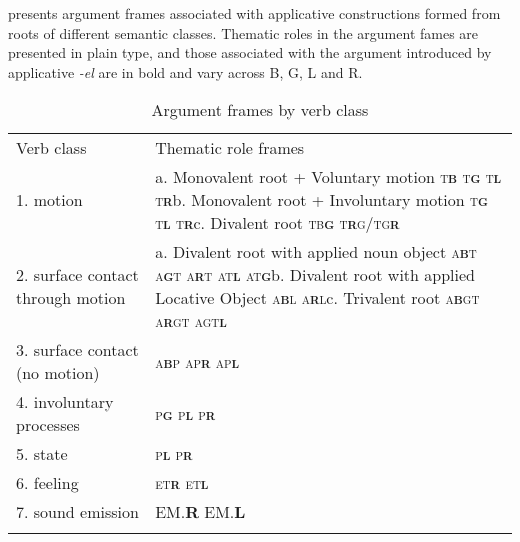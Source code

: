\documentclass[output=paper]{langsci/langscibook}
\begin{document}
 presents argument frames associated with applicative constructions formed from roots of different semantic classes. Thematic roles in the argument fames are presented in plain type, and those associated with the argument introduced by applicative \textit{-el} are in bold and vary across B, G, L and R. 

\begin{table}
\caption{Argument frames by verb class}
\label{tab:2}

\begin{tabularx}{\textwidth}{XX}
\lsptoprule
{Verb class} & {Thematic role frames}\\
{1. motion} & {a. Monovalent root + Voluntary motion} {\textsc{t}\textbf{\textsc{b}} \textsc{t}\textbf{\textsc{g}} \textsc{t}\textbf{\textsc{l}} \textsc{t}\textbf{\textsc{r}}}{b. Monovalent root + Involuntary motion} {\textsc{t}\textbf{\textsc{g}} \textsc{t}\textbf{\textsc{l}} \textsc{t}\textbf{\textsc{r}}}{c. Divalent root} {\textsc{tb}\textbf{\textsc{g}} \textsc{t}\textbf{\textsc{r}}\textsc{g/tg}\textbf{\textsc{r}} \textsc{}}\\
{2. surface contact through motion} & {a. Divalent root with applied noun object} {\textsc{a}\textbf{\textsc{b}}\textsc{t a}\textbf{\textsc{g}}\textsc{t a}\textbf{\textsc{r}}\textsc{t at}\textbf{\textsc{l}} \textsc{at}\textbf{\textsc{g}}}{b. Divalent root with applied Locative Object} {\textsc{a}\textbf{\textsc{b}}\textsc{l a}\textbf{\textsc{r}}\textsc{l}}{c. Trivalent root} {\textsc{a}\textbf{\textsc{b}}\textsc{gt a}\textbf{\textsc{r}}\textsc{gt agt}\textbf{\textsc{l}}}\\
{3. surface contact (no motion)} & {\textsc{a}\textbf{\textsc{b}}\textsc{p ap}\textbf{\textsc{r}} \textsc{ap}\textbf{\textsc{l}}}\\
{4. involuntary processes } & {\textsc{p}\textbf{\textsc{g}} \textsc{p}\textbf{\textsc{l}} \textsc{p}\textbf{\textsc{r}}}\\
{5. state} & {\textsc{p}\textbf{\textsc{l}} \textsc{p}\textbf{\textsc{r}}}\\
{6. feeling} & {\textsc{et}\textbf{\textsc{r}} \textsc{et}\textbf{\textsc{l}}}\\
{7. sound emission } & {\textsc{EM.}\textbf{\textsc{R}} \textsc{EM.}\textbf{\textsc{L}}}\\
\lspbottomrule
\end{tabularx}

\end{table}
\end{document}
